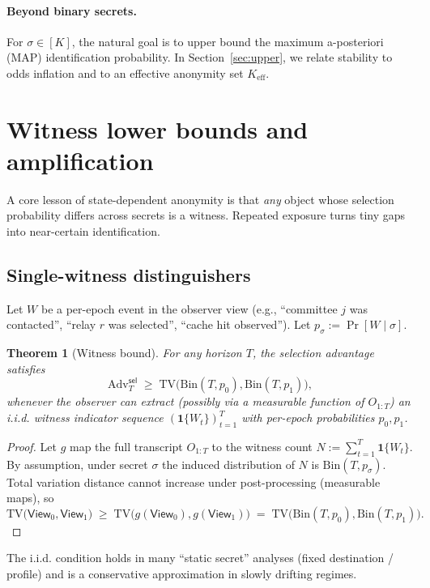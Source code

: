 \documentclass[11pt]{article}
\newtheorem{theorem}{Theorem}
\newcommand{\Adv}{\mathrm{Adv}}
\newcommand{\TV}{\mathrm{TV}}
\begin{document}
\paragraph{Beyond binary secrets.}
For $\sigma\in[K]$, the natural goal is to upper bound the maximum a-posteriori (MAP) identification probability.
In Section~\ref{sec:upper}, we relate stability to odds inflation and to an effective anonymity set $K_{\mathrm{eff}}$.


\section{Witness lower bounds and amplification}
\label{sec:lower}

A core lesson of state-dependent anonymity is that \emph{any} object whose selection probability differs across secrets is a witness.
Repeated exposure turns tiny gaps into near-certain identification.

\subsection{Single-witness distinguishers}
\label{sec:witness}
Let $W$ be a per-epoch event in the observer view (e.g., ``committee $j$ was contacted'', ``relay $r$ was selected'', ``cache hit observed'').
Let $p_\sigma := \Pr[W\mid \sigma]$.

\begin{theorem}[Witness bound]
\label{thm:sel-witness}
For any horizon $T$, the selection advantage satisfies
\[
\Adv^{\mathsf{sel}}_T \;\ge\; \TV\big(\mathrm{Bin}(T,p_0),\mathrm{Bin}(T,p_1)\big),
\]
whenever the observer can extract (possibly via a measurable function of $O_{1:T}$) an i.i.d. witness indicator sequence $(\mathbf{1}\{W_t\})_{t=1}^T$ with per-epoch probabilities $p_0,p_1$.
\end{theorem}

\begin{proof}
Let $g$ map the full transcript $O_{1:T}$ to the witness count $N:=\sum_{t=1}^T \mathbf{1}\{W_t\}$.
By assumption, under secret $\sigma$ the induced distribution of $N$ is $\mathrm{Bin}(T,p_\sigma)$.
Total variation distance cannot increase under post-processing (measurable maps), so
\[\TV\big(\mathsf{View}_0,\mathsf{View}_1\big)\;\ge\;\TV\big(g(\mathsf{View}_0),g(\mathsf{View}_1)\big)\;=\;\TV\big(\mathrm{Bin}(T,p_0),\mathrm{Bin}(T,p_1)\big).\]
\end{proof}

The i.i.d. condition holds in many ``static secret'' analyses (fixed destination / profile) and is a conservative approximation in slowly drifting regimes.
\end{document}
